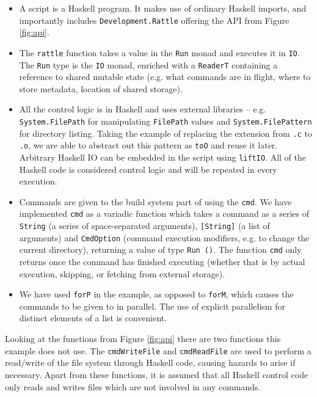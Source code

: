 \begin{itemize}
\item A \Rattle script is a Haskell program. It makes use of ordinary Haskell imports, and importantly includes \texttt{Development.Rattle} offering the API from Figure \ref{fig:api}.
\item The \texttt{rattle} function takes a value in the \texttt{Run} monad and executes it in \texttt{IO}. The \texttt{Run} type is the \texttt{IO} monad, enriched with a \texttt{ReaderT} containing a reference to shared mutable state (e.g. what commands are in flight, where to store metadata, location of shared storage).
\item All the control logic is in Haskell and uses external libraries -- e.g. \texttt{System.FilePath} for manipulating \texttt{FilePath} values and \texttt{System.FilePattern} for directory listing. Taking the example of replacing the extension from \texttt{.c} to \texttt{.o}, we are able to abstract out this pattern as \texttt{toO} and reuse it later. Arbitrary Haskell IO can be embedded in the script using \texttt{liftIO}. All of the Haskell code is considered control logic and will be repeated in every execution.
\item Commands are given to the build system part of \Rattle using the \texttt{cmd}. We have implemented \texttt{cmd} as a variadic function \cite{variadic_functions} which takes a command as a series of \texttt{String} (a series of space-separated arguments), \texttt{[String]} (a list of arguments) and \texttt{CmdOption} (command execution modifiers, e.g. to change the current directory), returning a value of type \texttt{Run ()}. The function \texttt{cmd} only returns once the command has finished executing (whether that is by actual execution, skipping, or fetching from external storage).
\item We have used \texttt{forP} in the example, as opposed to \texttt{forM}, which causes the commands to be given to \Rattle in parallel. The use of explicit parallelism for distinct elements of a list is convenient.
\end{itemize}

Looking at the functions from Figure \ref{fig:api} there are two functions this example does not use. The \texttt{cmdWriteFile} and \texttt{cmdReadFile} are used to perform a read/write of the file system through Haskell code, causing hazards to arise if necessary. Apart from these functions, it is assumed that all Haskell control code only reads and writes files which are not involved in any commands.

